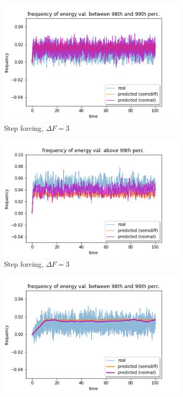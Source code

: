 \documentclass{article}
\begin{document}
\begin{figure}[!ht]
	\centering
	\begin{subfigure}[b]{0.48\textwidth}
		\includegraphics[width=1\linewidth]{fig/pred_energy_bin_098q_099q_S_30.png}
		\caption{Step forcing, $\Delta F=3$}
		\label{fig:pred_energy_bin_098q_099q_S_30}
	\end{subfigure}%
	\begin{subfigure}[b]{0.48\textwidth}
		\includegraphics[width=1\linewidth]{fig/pred_energy_exceed_099q_S_30.png}
		\caption{Step forcing, $\Delta F=3$}
		\label{fig:pred_energy_exceed_099q_S_30}
	\end{subfigure}
	\begin{subfigure}[b]{0.48\textwidth}
		\includegraphics[width=1\linewidth]{fig/pred_energy_bin_098q_099q_L_03_10.png}

\end{subfigure}
\end{figure}
\end{document}
